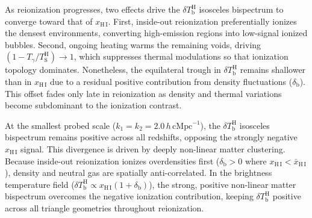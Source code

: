 \documentclass[apj,twocolumn, appendixfloats, twocolappendix, numberedappendix, tighten]{openjournal}
\begin{document}
As reionization progresses, two effects drive the $\delta T_\mathrm{b}^\mathrm{H}$ isosceles bispectrum to converge toward that of $x_\mathrm{H\,I}$. First, inside-out reionization preferentially ionizes the densest environments, converting high-emission regions into low-signal ionized bubbles. Second, ongoing heating warms the remaining voids, driving $(1 - T_\gamma/T_\mathrm{S}^\mathrm{H}) \to 1$, which suppresses thermal modulations so that ionization topology dominates. Nonetheless, the equilateral trough in $\delta T_\mathrm{b}^\mathrm{H}$ remains shallower than in $x_\mathrm{H\,I}$ due to a residual positive contribution from density fluctuations ($\delta_\mathrm{b}$). This offset fades only late in reionization as density and thermal variations become subdominant to the ionization contrast.




At the smallest probed scale ($k_1 = k_2 = 2.0\,h\,\mathrm{cMpc}^{-1}$), the $\delta T_\mathrm{b}^\mathrm{H}$ isosceles bispectrum remains positive across all redshifts, opposing the strongly negative $x_\mathrm{H\,I}$ signal. This divergence is driven by deeply non-linear matter clustering. Because inside-out reionization ionizes overdensities first ($\delta_\mathrm{b} > 0$ where $x_\mathrm{H\,I} < \bar{x}_\mathrm{H\,I}$), density and neutral gas are spatially anti-correlated. In the brightness temperature field ($\delta T_\mathrm{b}^\mathrm{H} \propto x_\mathrm{H\,I}(1+\delta_\mathrm{b})$), the strong, positive non-linear matter bispectrum overcomes the negative ionization contribution, keeping $\delta T_\mathrm{b}^\mathrm{H}$ positive across all triangle geometries throughout reionization.
\end{document}
